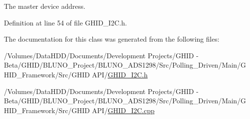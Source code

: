 \-The master device address. 



\-Definition at line 54 of file \-G\-H\-I\-D\-\_\-\-I2\-C.\-h.



\-The documentation for this class was generated from the following files\-:\begin{DoxyCompactItemize}
\item 
/\-Volumes/\-Data\-H\-D\-D/\-Documents/\-Development Projects/\-G\-H\-I\-D -\/ Beta/\-G\-H\-I\-D/\-B\-L\-U\-N\-O\-\_\-\-Project/\-B\-L\-U\-N\-O\-\_\-\-A\-D\-S1298/\-Src/\-Polling\-\_\-\-Driven/\-Main/\-G\-H\-I\-D\-\_\-\-Framework/\-Src/\-G\-H\-I\-D A\-P\-I/\hyperlink{_g_h_i_d___i2_c_8h}{\-G\-H\-I\-D\-\_\-\-I2\-C.\-h}\item 
/\-Volumes/\-Data\-H\-D\-D/\-Documents/\-Development Projects/\-G\-H\-I\-D -\/ Beta/\-G\-H\-I\-D/\-B\-L\-U\-N\-O\-\_\-\-Project/\-B\-L\-U\-N\-O\-\_\-\-A\-D\-S1298/\-Src/\-Polling\-\_\-\-Driven/\-Main/\-G\-H\-I\-D\-\_\-\-Framework/\-Src/\-G\-H\-I\-D A\-P\-I/\hyperlink{_g_h_i_d___i2_c_8cpp}{\-G\-H\-I\-D\-\_\-\-I2\-C.\-cpp}\end{DoxyCompactItemize}
